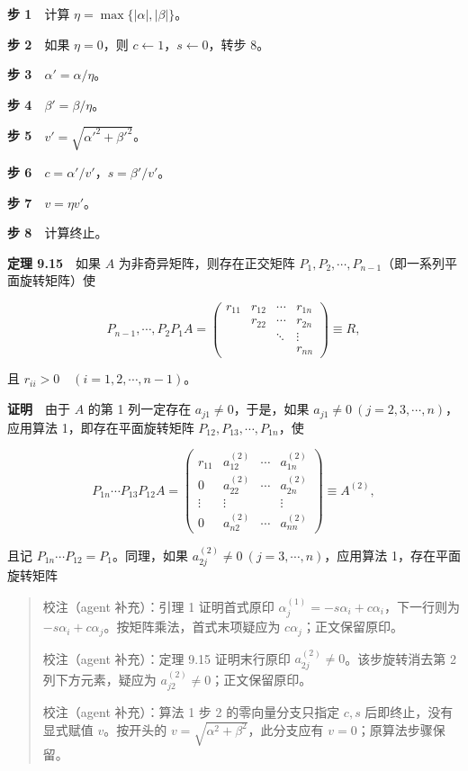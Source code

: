 \documentclass[
  10pt,
  fontset=fandol]{ctexart}
\begin{document}
\textbf{步 1}　计算 \(\eta=\max\{|\alpha|,|\beta|\}\)。

\textbf{步 2}　如果 \(\eta=0\)，则 \(c\leftarrow1\)，\(s\leftarrow0\)，转步 8。

\textbf{步 3}　\(\alpha'=\alpha/\eta\)。

\textbf{步 4}　\(\beta'=\beta/\eta\)。

\textbf{步 5}　\(v'=\sqrt{\alpha'^2+\beta'^2}\)。

\textbf{步 6}　\(c=\alpha'/v'\)，\(s=\beta'/v'\)。

\textbf{步 7}　\(v=\eta v'\)。

\textbf{步 8}　计算终止。

\textbf{定理 9.15}　如果 \(A\) 为非奇异矩阵，则存在正交矩阵 \(P_1,P_2,\cdots,P_{n-1}\)（即一系列平面旋转矩阵）使

\[
P_{n-1},\cdots,P_2P_1A=\begin{pmatrix}
r_{11}&r_{12}&\cdots&r_{1n}\\
&r_{22}&\cdots&r_{2n}\\
&&\ddots&\vdots\\
&&&r_{nn}
\end{pmatrix}\equiv R,
\tag{9.4.5}
\]

且 \(r_{ii}>0\quad(i=1,2,\cdots,n-1)\)。

\textbf{证明}　由于 \(A\) 的第 1 列一定存在 \(a_{j1}\ne0\)，于是，如果 \(a_{j1}\ne0\ (j=2,3,\cdots,n)\)，应用算法 1，即存在平面旋转矩阵 \(P_{12},P_{13},\cdots,P_{1n}\)，使

\[
P_{1n}\cdots P_{13}P_{12}A=\begin{pmatrix}
r_{11}&a_{12}^{(2)}&\cdots&a_{1n}^{(2)}\\
0&a_{22}^{(2)}&\cdots&a_{2n}^{(2)}\\
\vdots&\vdots&&\vdots\\
0&a_{n2}^{(2)}&\cdots&a_{nn}^{(2)}
\end{pmatrix}\equiv A^{(2)},
\]

且记 \(P_{1n}\cdots P_{12}=P_1\)。同理，如果 \(a_{2j}^{(2)}\ne0\ (j=3,\cdots,n)\)，应用算法 1，存在平面旋转矩阵

\begin{quote}
校注（agent 补充）：引理 1 证明首式原印 \(\alpha_j^{(1)}=-s\alpha_i+c\alpha_i\)，下一行则为 \(-s\alpha_i+c\alpha_j\)。按矩阵乘法，首式末项疑应为 \(c\alpha_j\)；正文保留原印。

校注（agent 补充）：定理 9.15 证明末行原印 \(a_{2j}^{(2)}\ne0\)。该步旋转消去第 2 列下方元素，疑应为 \(a_{j2}^{(2)}\ne0\)；正文保留原印。

校注（agent 补充）：算法 1 步 2 的零向量分支只指定 \(c,s\) 后即终止，没有显式赋值 \(v\)。按开头的 \(v=\sqrt{\alpha^2+\beta^2}\)，此分支应有 \(v=0\)；原算法步骤保留。
\end{quote}
\end{document}

